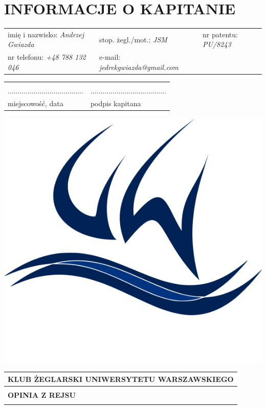 \documentclass{article}
\begin{document}
\section*{INFORMACJE O KAPITANIE}
\begin{tabularx}{\textwidth}{X X X}
imię i nazwisko: \textit{Andrzej Gwiazda} & stop. żegl./mot.: \textit{JSM} & nr patentu: \textit{PU/8243} \\
nr telefonu: \textit{+48 788 132 046} & e-mail: \textit{jedrekgwiazda@gmail.com} \\
\end{tabularx}

\begin{tabularx}{\textwidth}{X X}
\\\\
...................................... & ......................................\\
miejscowość, data & podpis kapitana\\
\end{tabularx}
\newpage
\begin{minipage}{0.11\textwidth}
\includegraphics[width=\textwidth]{logo.png}
\end{minipage}
\begin{minipage}{0.89\textwidth}
\begin{tabularx}{\textwidth} { 
  | >{\centering\arraybackslash}X | }
 \hline
 \textbf{KLUB ŻEGLARSKI UNIWERSYTETU WARSZAWSKIEGO} \\
 \hline
 \\
 \textbf{\huge OPINIA Z REJSU} \\
 \\
\hline
\end{tabularx}
\end{minipage}
\end{document}
